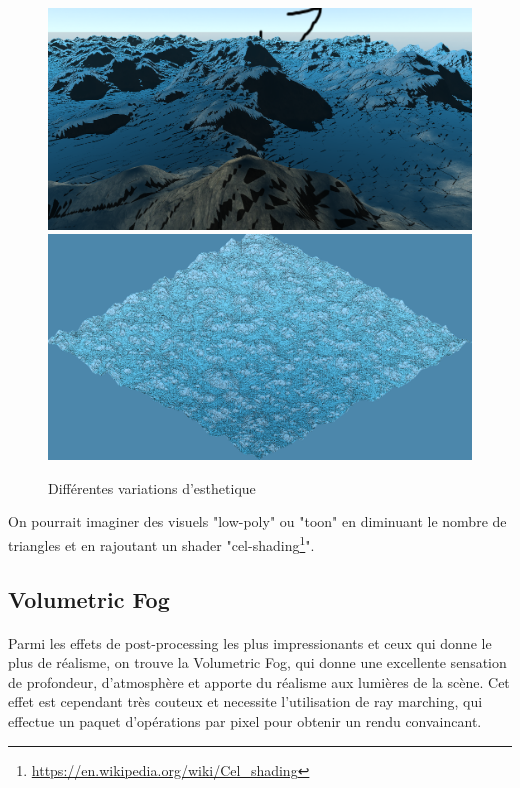 \documentclass{EPUProjetDi}
\begin{document}
\begin{figure}[ht]
	\centering
	\includegraphics[scale=.205]{esthetics_1}
	\includegraphics[scale=.2]{esthetics_2}
	\caption{Différentes variations d'esthetique}
	\label{fig:esthetics}
\end{figure}

On pourrait imaginer des visuels "low-poly" ou "toon" en diminuant le nombre de triangles et en rajoutant un shader "cel-shading\footnote{\url{https://en.wikipedia.org/wiki/Cel_shading}}".


\subsection{Volumetric Fog}

\paragraph{}
Parmi les effets de post-processing les plus impressionants et ceux qui donne le plus de réalisme, on trouve la Volumetric Fog, qui donne une excellente sensation de profondeur, d'atmosphère et apporte du réalisme aux lumières de la scène.
Cet effet est cependant très couteux et necessite l'utilisation de ray marching, qui effectue un paquet d'opérations par pixel pour obtenir un rendu convaincant.
\end{document}
